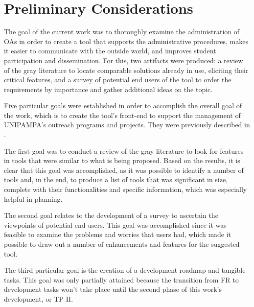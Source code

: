 \chapter{Preliminary Considerations}\label{conclusao}



The goal of the current work was to thoroughly examine the administration of \aclp{OA} in order to create a tool that supports the administrative procedures, makes it easier to communicate with the outside world, and improves student participation and dissemination. For this, two artifacts were produced: a review of the gray literature to locate comparable solutions already in use, eliciting their critical features, and a survey of potential end users of the tool to order the requirements by importance and gather additional ideas on the topic.

Five particular goals were established in order to accomplish the overall goal of the work, which is to create the tool's front-end to support the management of \ac{UNIPAMPA}'s outreach programs and projects. They were previously described in .

The first goal was to conduct a review of the gray literature to look for features in tools that were similar to what is being proposed. Based on the results, it is clear that this goal was accomplished, as it was possible to identify a number of tools and, in the end, to produce a list of tools that was significant in size, complete with their functionalities and specific information, which was especially helpful in planning.

The second goal relates to the development of a survey to ascertain the viewpoints of potential end users. This goal was accomplished since it was feasible to examine the problems and worries that users had, which made it possible to draw out a number of enhancements and features for the suggested tool.

The third particular goal is the creation of a development roadmap and tangible tasks. This goal was only partially attained because the transition from \ac{FR} to development tasks won't take place until the second phase of this work's development, or \ac{TP} II.

